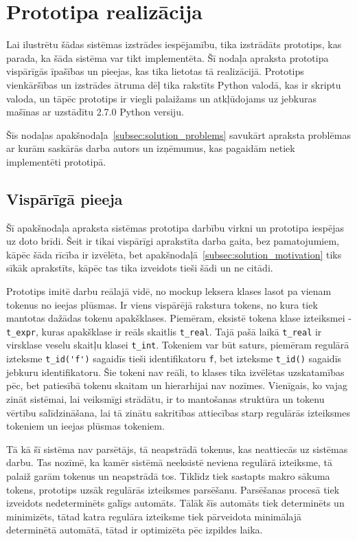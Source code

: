 \section{Prototipa realizācija}
Lai ilustrētu šādas sistēmas izstrādes iespējamību, tika izstrādāts prototips, kas parada, ka šāda sistēma var tikt implementēta. Šī nodaļa apraksta prototipa vispārīgās īpašības un pieejas, kas tika lietotas tā realizācijā. Prototips vienkāršības un izstrādes ātruma dēļ tika rakstīts Python valodā, kas ir skriptu valoda, un tāpēc prototips ir viegli palaižams un atkļūdojams uz jebkuras mašīnas ar uzstādītu 2.7.0 Python versiju.

Šīs nodaļas apakšnodaļa~\ref{subsec:solution_problems} savukārt apraksta problēmas ar kurām saskārās darba autors un izņēmumus, kas pagaidām netiek implementēti prototipā.


\subsection{\label{subsec:solution_approach}Vispārīgā pieeja}
Šī apakšnodaļa apraksta sistēmas prototipa darbību virkni un prototipa iespējas uz doto brīdi. Šeit ir tikai vispārīgi aprakstīta darba gaita, bez pamatojumiem, kāpēc šāda rīcība ir izvēlēta, bet apakšnodaļā~\ref{subsec:solution_motivation} tiks sīkāk aprakstīts, kāpēc tas tika izveidots tieši šādi un ne citādi.

Prototips imitē darbu reālajā vidē, no mockup leksera klases lasot pa vienam tokenus no ieejas plūsmas. Ir viens vispārējā rakstura tokens, no kura tiek mantotas dažādas tokenu apakšklases. Piemēram, eksistē tokena klase izteiksmei - \verb|t_expr|, kuras apakšklase ir reāls skaitlis \verb|t_real|. Tajā pašā laikā \verb|t_real| ir virsklase veselu skaitļu klasei \verb|t_int|. Tokeniem var būt saturs, piemēram regulārā izteksme \verb|t_id('f')| sagaidīs tieši identifikatoru \verb|f|, bet izteksme \verb|t_id()| sagaidīs jebkuru identifikatoru. Šie tokeni nav reāli, to klases tika izvēlētas uzskatamības pēc, bet patiesībā tokenu skaitam un hierarhijai nav nozīmes. Vienīgais, ko vajag zināt sistēmai, lai veiksmīgi strādātu, ir to mantošanas struktūra un tokenu vērtību salīdzināšana, lai tā zinātu sakritības attiecības starp regulārās izteiksmes tokeniem un ieejas plūsmas tokeniem.

Tā kā šī sistēma nav parsētājs, tā neapstrādā tokenus, kas neattiecās uz sistēmas darbu. Tas nozīmē, ka kamēr sistēmā neeksistē neviena regulārā izteiksme, tā palaiž garām tokenus un neapstrādā tos. Tiklīdz tiek sastapts makro sākuma tokens, prototips uzsāk regulārās izteiksmes parsēšanu. Parsēšanas procesā tiek izveidots nedeterminēts galīgs automāts. Tālāk šīs automāts tiek determinēts un minimizēts, tātad katra regulāra izteiksme tiek pārveidota minimālajā determinētā automātā, tātad ir optimizēta pēc izpildes laika.

